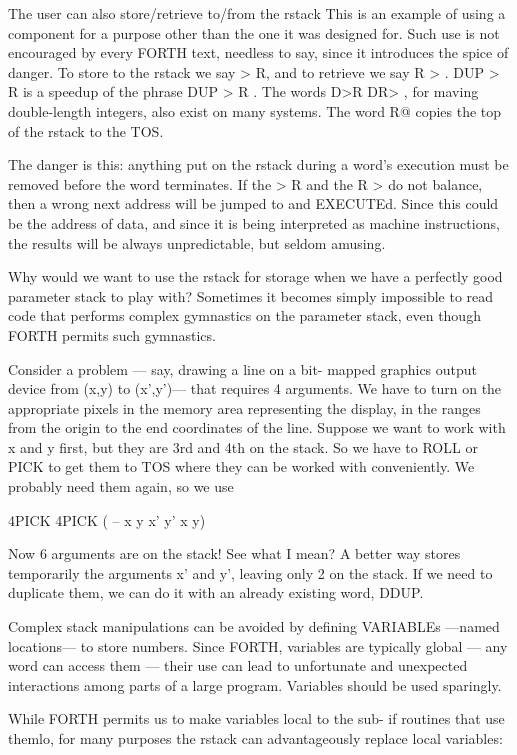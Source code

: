 The user can also store/retrieve to/from the rstack This is an example of using a component for a purpose other than the one it was designed for. Such use is not encouraged by every FORTH text, needless to say, since it introduces the spice of danger. To store to the rstack we say > R, and to retrieve we say R > . DUP > R is a speedup of the phrase DUP > R . The words D>R DR> , for maving double-length integers, also exist on many systems. The word R@ copies the top of the rstack to the TOS.

The danger is this: anything put on the rstack during a word’s execution must be removed before the word terminates. If the > R and the R > do not balance, then a wrong next address will be jumped to and EXECUTEd. Since this could be the address of data, and since it is being interpreted as machine instructions, the results will be always unpredictable, but seldom amusing.

Why would we want to use the rstack for storage when we have a perfectly good parameter stack to play with? Sometimes it becomes simply impossible to read code that performs complex gymnastics on the parameter stack, even though FORTH permits such gymnastics.

Consider a problem — say, drawing a line on a bit- mapped graphics output device from (x,y) to (x’,y’)— that requires 4 arguments. We have to turn on the appropriate pixels in the memory area representing the display, in the ranges from the origin to the end coordinates of the line. Suppose we want to work with x and y ﬁrst, but they are 3rd and 4th on the stack. So we have to ROLL or PICK to get them to TOS where they can be worked with conveniently. We probably need them again, so we use

4PICK 4PICK ( -- x y x' y' x y)

Now 6 arguments are on the stack! See what I mean? A better way stores temporarily the arguments x’ and y', leaving only 2 on the stack. If we need to duplicate them, we can do it with an already existing word, DDUP.

Complex stack manipulations can be avoided by deﬁning VARIABLEs —named locations— to store numbers. Since FORTH, variables are typically global — any word can access them — their use can lead to unfortunate and unexpected interactions among parts of a large program. Variables should be used sparingly.

While FORTH permits us to make variables local to the sub- if routines that use themlo, for many purposes the rstack can advantageously replace local variables:

